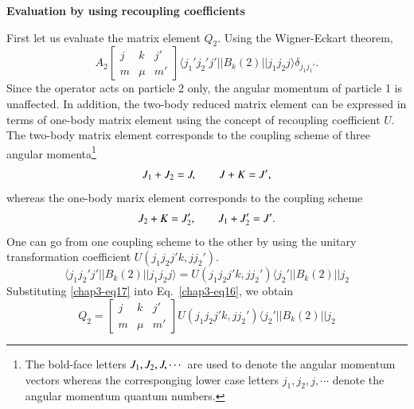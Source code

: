 \medskip
\noindent \textbf{\large Evaluation by using recoupling coefficients}
\medskip

\noindent First let us evaluate the matrix element $Q_2$. Using the Wigner-Eckart theorem,
\begin{equation}
A_2 \begin{bmatrix}j & k & j'\\m & \mu & m'\end{bmatrix}
\langle j_1' j_2' j' || B_k (2) || j_1 j_2 j \rangle \delta_{j_1 j_1'}. \label{chap3-eq16}
\end{equation}
Since the operator acts on particle 2 only, the angular momentum of particle 1 is unaffected. In addition, the two-body reduced matrix element can be expressed in terms of one-body matrix element using the concept of recoupling coefficient $U$. The two-body matrix element corresponds to the coupling scheme of three angular momenta\footnote{The bold-face letters ${\boldmath  J}_1, {\boldmath  J}_2, {\boldmath  J}, \cdots$ are used to denote the angular momentum vectors whereas the corresponging lower case letters $j_1, j_2, j, \cdots$ denote the angular momentum quantum numbers.}
$$
{\boldmath  J}_1 + {\boldmath  J}_2 = {\boldmath  J}, \qquad {\boldmath  J}+ {\boldmath  K}= {\boldmath  J}',
$$
whereas the one-body marix element corresponds to the coupling scheme
$$
{\boldmath  J}_2 + {\boldmath  K} = {\boldmath  J}_2', \qquad {\boldmath  J}_1+ {\boldmath  J}_2'= {\boldmath  J}'.
$$
One can go from one coupling scheme to the other by using the unitary transformation coefficient $U(j_1 j_2 j' k, j j_2')$.
\begin{equation}
\langle j_1 j_2' j' || B_k (2) || j_1 j_2 j \rangle = U (j_1 j_2 j' k, j j_2') \langle j_2' || B_k (2) || j_2 \label{chap3-eq17}
\end{equation}
Substituting \eqref{chap3-eq17} into Eq.\ \eqref{chap3-eq16}, we obtain
\begin{equation}
Q_2 = \begin{bmatrix}j & k & j'\\m & \mu & m'\end{bmatrix}
U (j_1 j_2 j' k, j j_2') \langle j_2' || B_k (2) || j_2 \label{chap3-eq18}
\end{equation}

